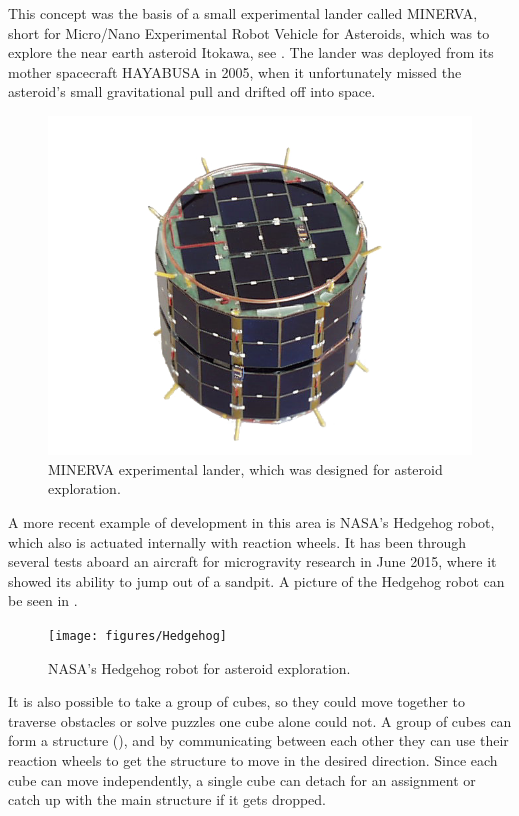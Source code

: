 This concept was the basis of a small experimental lander called MINERVA, short for Micro/Nano Experimental Robot Vehicle for Asteroids, which was to explore the near earth asteroid Itokawa, see . The lander was deployed from its mother spacecraft HAYABUSA in 2005, when it unfortunately missed the asteroid's small gravitational pull and drifted off into space.\cite{TYoshimitsu}
%
\begin{figure}[H] 
	\centering
	\includegraphics[scale=.7]{figures/MINERVA2}
	\caption{MINERVA experimental lander, which was designed for asteroid exploration.\cite{TYoshimitsu}}
	\label{MINERVA}
\end{figure}\vspace{-18pt}
A more recent example of development in this area is NASA's Hedgehog robot, which also is actuated internally with reaction wheels. It has been through several tests aboard an aircraft for microgravity research in June 2015, where it showed its ability to jump out of a sandpit. A picture of the Hedgehog robot can be seen in .\cite{ELandau}
%
\begin{figure}[H] 
	\centering
	\texttt{[image: figures/Hedgehog]}
	\caption{NASA's Hedgehog robot for asteroid exploration.\cite{ELandau}}
	\label{Hedgehog}
\end{figure}\vspace{-18pt}
It is also possible to take a group of cubes, so they could move together to traverse obstacles or solve puzzles one cube alone could not. A group of cubes can form a structure (), and by communicating between each other they can use their reaction wheels to get the structure to move in the desired direction. Since each cube can move independently, a single cube can detach for an assignment or catch up with the main structure if it gets dropped.\cite{JRomanishin}
